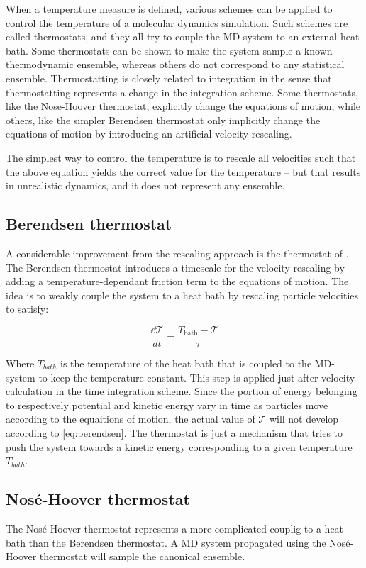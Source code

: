 When a temperature measure is defined, various schemes can be applied to control the temperature of a molecular dynamics simulation. Such schemes are called thermostats, and they all try to couple the MD system to an external heat bath. Some thermostats can be shown to make the system sample a known thermodynamic ensemble, whereas others do not correspond to any statistical ensemble. Thermostatting is closely related to integration in the sense that thermostatting represents a change in the integration scheme. Some thermostats, like the Nose-Hoover thermostat, explicitly change the equations of motion, while others, like the simpler Berendsen thermostat only implicitly change the equations of motion by introducing an artificial velocity rescaling. 

The simplest way to control the temperature is to rescale all velocities such that the above equation yields the correct value for the temperature -- but that results in unrealistic dynamics, and it does not represent any ensemble.

\subsection{Berendsen thermostat}
A considerable improvement from the rescaling approach is the thermostat of \citet{Berendsen1984}. The Berendsen thermostat introduces a timescale for the velocity rescaling by adding a temperature-dependant friction term to the equations of motion. The idea is to weakly couple the system to a heat bath by rescaling particle velocities to satisfy:

\begin{equation}
\frac{\dd \mathcal{T}}{dt} = \frac{T_{\text{bath}}-\mathcal{T}}{\tau}
\label{eq:berendsen}
\end{equation}

Where $T_{bath}$ is the temperature of the heat bath that is coupled to the MD-system to keep the temperature constant. This step is applied just after velocity calculation in the time integration scheme. Since the portion of energy belonging to respectively potential and kinetic energy vary in time as particles move according to the equaitions of motion, the actual value of $\mathcal{T}$ will not develop according to \ref{eq:berendsen}. The thermostat is just a mechanism that tries to push the system towards a kinetic energy corresponding to a given temperature $T_{bath}$.

\subsection{Nosé-Hoover thermostat}
The Nosé-Hoover thermostat represents a more complicated couplig to a heat bath than the Berendsen thermostat. A MD system propagated using the Nosé-Hoover thermostat will sample the canonical ensemble. 

